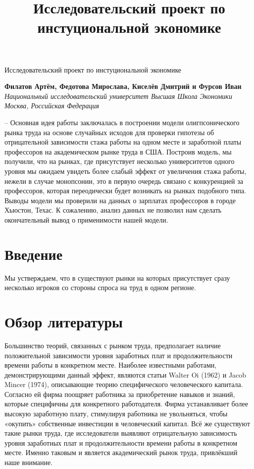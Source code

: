 \documentclass[a4paper, 12pt]{article}
\title{Исследовательский проект по инстуциональной экономике}
\theoremstyle{definition}
\theoremstyle{plain}
\begin{document}
\begin{center}
{\Large\sc Исследовательский проект по инстуциональной экономике}\vspace{0.2cm}\\
\end{center}
\begin{center}
{\bf Филатов Артём, Федотова Мирослава, Киселёв Дмитрий и Фурсов Иван}\vspace{0.1cm}\\
{\it Национальный исследовательский университет Высшая Школа Экономики\\ 
Москва, Российская Федерация}\vspace{0.1cm}\\
\end{center}


-- Основная идея работы заключалась в построении модели олигпсонического рынка труда на основе случайных исходов для проверки гипотезы об отрицательной зависимости стажа работы на одном месте и заработной платы профессоров на академическом рынке труда в США. Построив модель, мы получили, что на рынках, где присутствует несколько университетов одного уровня мы ожидаем увидеть более слабый эффект от увеличения стажа работы,  нежели в случае монопсонии, это в первую очередь связано с конкуренцией за профессоров, которая переодически будет возникать на рынках подобного типа. Выводы модели мы проверили на данных о зарплатах профессоров в городе Хьюстон, Техас. К сожалению, анализ данных не позволил нам сделать окончательный вывод о применимости нашей модели. 

\section{Введение}
Мы устверждаем, что в существуют рынки на которых присутствует сразу несколько игроков со стороны спроса на труд в одном регионе. 
\section{Обзор литературы}

Большинство теорий, связанных с рынком труда, предполагает наличие положительной зависимости уровня заработных плат и продолжительности времени работы в конкретном месте. Наиболее известными работами, демонстрирующими данный эффект, являются статьи Walter Oi (1962) и Jacob Mincer (1974), описывающие теорию специфического человеческого капитала. Согласно ей фирма поощряет работника за приобретение навыков и знаний, которые специфичны для конкретного работодателя. Фирма устанавливает более высокую заработную плату, стимулируя работника не увольняться, чтобы «окупить» собственные инвестиции в человеческий капитал. Всё же существуют такие рынки труда, где исследователи выявляют отрицательную зависимость уровня заработных плат и продолжительности времени работы в конкретном месте. Именно таковым и является академический рынок труда, привлёкший наше внимание.
\end{document}
